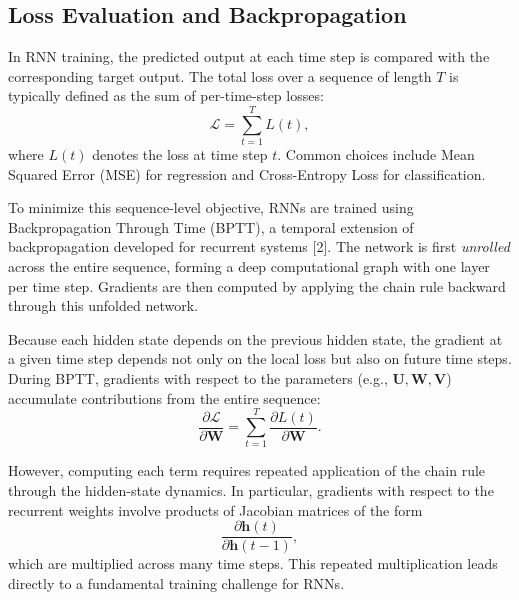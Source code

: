 \documentclass{article}
\renewcommand{\cite}[1]{[#1]}
\begin{document}



\subsection{Loss Evaluation and Backpropagation}

In RNN training, the predicted output at each time step is compared with the corresponding target output. The total loss over a sequence of length \(T\) is typically defined as the sum of per-time-step losses:
\[
\mathcal{L} = \sum_{t=1}^{T} L(t),
\]
where \(L(t)\) denotes the loss at time step \(t\). Common choices include Mean Squared Error (MSE) for regression and Cross-Entropy Loss for classification.

To minimize this sequence-level objective, RNNs are trained using Backpropagation Through Time (BPTT), a temporal extension of backpropagation developed for recurrent systems \cite{2}. The network is first \emph{unrolled} across the entire sequence, forming a deep computational graph with one layer per time step. Gradients are then computed by applying the chain rule backward through this unfolded network.

Because each hidden state depends on the previous hidden state, the gradient at a given time step depends not only on the local loss but also on future time steps. During BPTT, gradients with respect to the parameters (e.g., \( \mathbf{U}, \mathbf{W}, \mathbf{V} \)) accumulate contributions from the entire sequence:
\[
\frac{\partial \mathcal{L}}{\partial \mathbf{W}} 
= \sum_{t=1}^{T} \frac{\partial L(t)}{\partial \mathbf{W}}.
\]

However, computing each term requires repeated application of the chain rule through the hidden-state dynamics. In particular, gradients with respect to the recurrent weights involve products of Jacobian matrices of the form
\[
\frac{\partial \mathbf{h}(t)}{\partial \mathbf{h}(t-1)},
\]
which are multiplied across many time steps. This repeated multiplication leads directly to a fundamental training challenge for RNNs.
\end{document}
